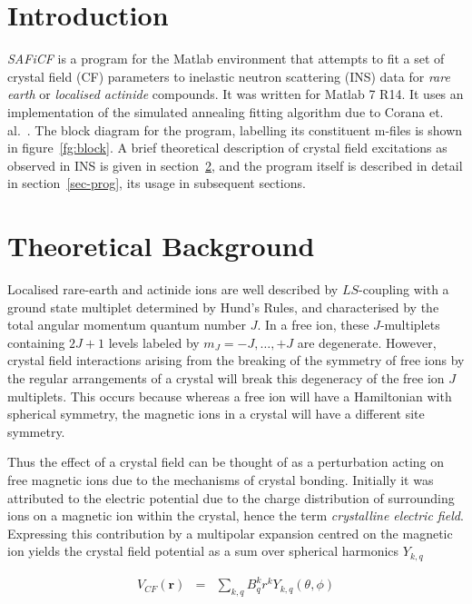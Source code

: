 \documentclass[12pt,onecolumn,tightenlines,aps,amsmath,floatfix,notitlepage,nofootinbib]{revtex4}
\newcommand{\V}[1]{\mathbf{#1}}
\begin{document}
\section{Introduction} \label{sec-intro}

\emph{SAFiCF} is a program for the Matlab environment that attempts to fit a set of crystal field (CF) parameters to inelastic neutron scattering (INS) data for \emph{rare earth} or \emph{localised actinide} compounds. It was written for Matlab 7 R14. It uses an implementation of the simulated annealing fitting algorithm due to Corana et. al.~\cite{CMMR87}. The block diagram for the program, labelling its constituent m-files is shown in figure~\ref{fg:block}. A brief theoretical description of crystal field excitations as observed in INS is given in section~\ref{sec-theory}, and the program itself is described in detail in section~\ref{sec-prog}, its usage in subsequent sections. 


\section{Theoretical Background} \label{sec-theory}

Localised rare-earth and actinide ions are well described by $LS$-coupling with a ground state multiplet determined by Hund's Rules, and characterised by the total angular momentum quantum number $J$. In a free ion, these $J$-multiplets containing $2J+1$ levels labeled by $m_J = -J,\ldots,+J$ are degenerate. However, crystal field interactions arising from the breaking of the symmetry of free ions by the regular arrangements of a crystal will break this degeneracy of the free ion $J$ multiplets. This occurs because whereas a free ion will have a Hamiltonian with spherical symmetry, the magnetic ions in a crystal will have a different site symmetry. 

Thus the effect of a crystal field can be thought of as a perturbation acting on free magnetic ions due to the mechanisms of crystal bonding. Initially it was attributed to the electric potential due to the charge distribution of surrounding ions on a magnetic ion within the crystal, hence the term \emph{crystalline electric field}. Expressing this contribution by a multipolar expansion centred on the magnetic ion yields the crystal field potential as a sum over spherical harmonics $Y_{k,q}$

\begin{eqnarray} \label{eq:cfexp}
V_{CF}(\V{r}) &=& \sum_{k,q} B_q^k r^k Y_{k,q}(\theta,\phi) %
\end{eqnarray}
\end{document}
